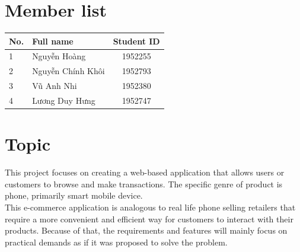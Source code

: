 \documentclass[a4paper]{article}
\numberwithin{equation}{section}
\begin{document}
\tableofcontents
\newpage

\section*{Member list}
\begin{center}
  \begin{tabular}{llc}
    \toprule
    \textbf{No.} & \textbf{Full name} & \textbf{Student ID} \\
    \midrule
    1            & Nguyễn Hoàng       & 1952255             \\
    2            & Nguyễn Chính Khôi  & 1952793             \\
    3            & Vũ Anh Nhi         & 1952380             \\
    4            & Lương Duy Hưng     & 1952747             \\
    \bottomrule
  \end{tabular}
\end{center}

\newpage

\section{Topic}
This project focuses on creating a web-based application that allows users or customers to browse and make transactions.
The specific genre of product is phone, primarily smart mobile device. \\

This e-commerce application is analogous to real life phone selling retailers that require a more convenient and efficient way for customers to interact with their products.
Because of that, the requirements and features will mainly focus on practical demands as if it was proposed to solve the problem.
\end{document}
